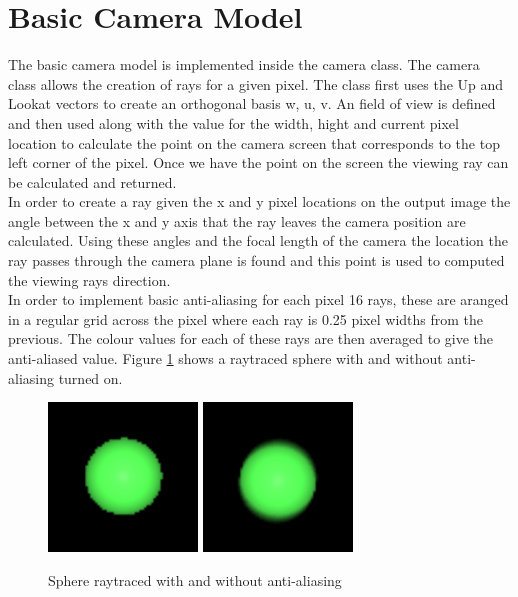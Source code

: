 \documentclass{article}
\begin{document}
\section{Basic Camera Model}

The basic camera model is implemented inside the camera class. The camera class
allows the creation of rays for a given pixel. The class first uses the Up and
Lookat vectors to create an orthogonal basis w, u, v. An field of view is defined
and then used along with the value for the width, hight and current pixel location
to calculate the point on the camera screen that corresponds to the top left corner
of the pixel. Once we have the point on the screen the viewing ray can be calculated
and returned.\\

In order to create a ray given the x and y pixel locations on the output image
the angle between the x and y axis that the ray leaves the camera position are
calculated. Using these angles and the focal length of the camera the location
the ray passes through the camera plane is found and this point is used to
computed the viewing rays direction.\\

In order to implement basic anti-aliasing for each pixel 16 rays, these are aranged in
a regular grid across the pixel where each ray is 0.25 pixel widths from the previous.
The colour values for each of these rays are then averaged to give the anti-aliased
value. Figure \ref{fig:antialias} shows a raytraced sphere with and without anti-aliasing
turned on.\\

\begin{figure}[H]
  \begin{center}
  \includegraphics[width=150px]{Images/antialiasOff.png}
  \includegraphics[width=150px]{Images/antialiasOn.png}
  \caption{Sphere raytraced with and without anti-aliasing}
  \label{fig:antialias}
  \end{center}
\end{figure}
\end{document}
